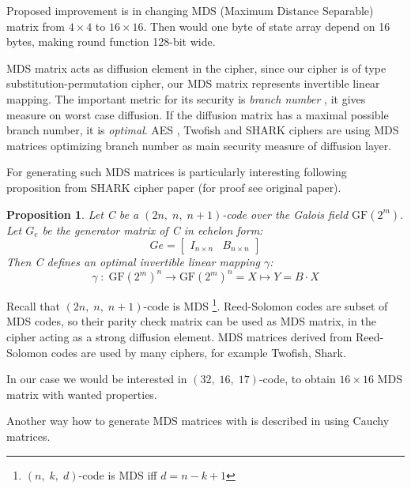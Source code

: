 \documentclass[11pt,oneside,final]{fithesis2}
\newtheorem{myprop}{Proposition}
\begin{document}
    Proposed improvement is in changing MDS (Maximum Distance Separable) matrix from $4 \times 4$ to $16 \times 16$. 
    Then would one byte of state array depend on 16 bytes, making round function 128-bit wide.

    MDS matrix acts as diffusion element in the cipher, since our cipher is of type substitution-permutation cipher, our MDS matrix 
    represents invertible linear mapping. The important metric for its security is \emph{branch number} \citep{daemenBranch}, it gives measure on
    worst case diffusion. If the diffusion matrix has a maximal possible branch number, it is \emph{optimal}. 
    AES \citep{2002-daemen}, Twofish \citep{Schneier98twofish:a} and SHARK \citep{shark96} ciphers are using MDS matrices optimizing branch number as 
    main security measure of diffusion layer.
    
    For generating such MDS matrices is particularly interesting following proposition from SHARK cipher paper \citep{shark96} (for proof see
    original paper).
    
    \begin{myprop}
	Let C be a $(2n,\; n,\; n+1)$-code over the Galois field $\text{GF}(2^m)$. Let $G_e$  be the generator matrix of C in echelon form:
	\begin{equation}
	   Ge = \begin{bmatrix} I_{n \times n} & B_{n \times n}\end{bmatrix}
	\end{equation}
	Then C defines an optimal invertible linear mapping $\gamma$:
	\begin{equation}
	   \gamma \; : \; \text{GF}(2^m)^n \rightarrow \text{GF}(2^m)^n = X \mapsto Y = B \cdot X
	\end{equation}
    \end{myprop}
    
    Recall that $(2n,\; n,\; n+1)$-code is MDS \footnote{$(n,\;k,\;d)$-code is MDS iff $d=n-k+1$}. Reed-Solomon codes are subset of MDS codes, so their 
    parity check matrix can be used as MDS matrix, in the cipher acting as a strong diffusion element. MDS matrices derived from Reed-Solomon codes are used by many 
    ciphers, for example Twofish, Shark. 

    In our case we would be interested in $(32,\;16,\;17)$-code, to obtain $16 \times 16$ MDS matrix with wanted properties.
    
    Another way how to generate MDS matrices with is described in \citep{Roth:1985:GMM:7030.7044} using Cauchy matrices. 
\end{document}
